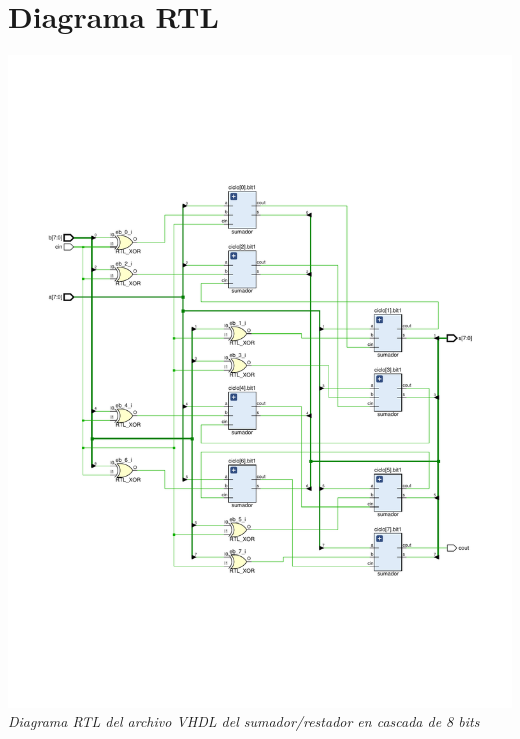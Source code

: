 \documentclass[12pt,executivepaper]{article}
\begin{document}
\section{Diagrama RTL}
\begin{center}
    \includegraphics[scale=0.7]{sources/rtlDiagram.pdf}
    \textit{Diagrama RTL del archivo VHDL del sumador/restador en cascada de 8 bits}
\end{center}
\end{document}
